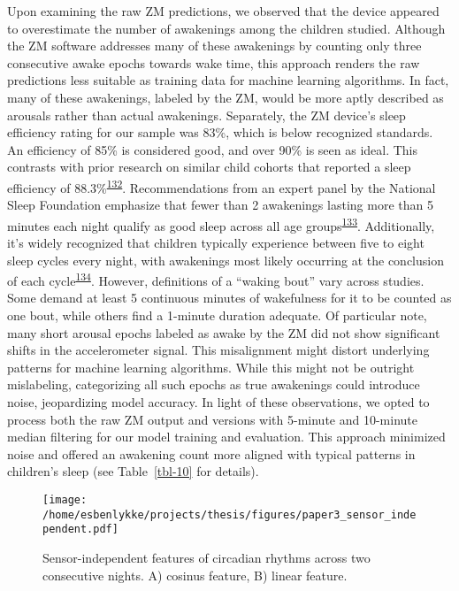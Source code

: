 \documentclass[
  9pt,
]{scrbook}
\begin{document}
Upon examining the raw ZM predictions, we observed that the device
appeared to overestimate the number of awakenings among the children
studied. Although the ZM software addresses many of these awakenings by
counting only three consecutive awake epochs towards wake time, this
approach renders the raw predictions less suitable as training data for
machine learning algorithms. In fact, many of these awakenings, labeled
by the ZM, would be more aptly described as arousals rather than actual
awakenings. Separately, the ZM device's sleep efficiency rating for our
sample was 83\%, which is below recognized standards. An efficiency of
85\% is considered good, and over 90\% is seen as ideal. This contrasts
with prior research on similar child cohorts that reported a sleep
efficiency of
88.3\%\textsuperscript{\protect\hyperlink{ref-galland_2018}{132}}.
Recommendations from an expert panel by the National Sleep Foundation
emphasize that fewer than 2 awakenings lasting more than 5 minutes each
night qualify as good sleep across all age
groups\textsuperscript{\protect\hyperlink{ref-ohayon_2017}{133}}.
Additionally, it's widely recognized that children typically experience
between five to eight sleep cycles every night, with awakenings most
likely occurring at the conclusion of each
cycle\textsuperscript{\protect\hyperlink{ref-galland_normal_2012}{134}}.
However, definitions of a ``waking bout'' vary across studies. Some
demand at least 5 continuous minutes of wakefulness for it to be counted
as one bout, while others find a 1-minute duration adequate. Of
particular note, many short arousal epochs labeled as awake by the ZM
did not show significant shifts in the accelerometer signal. This
misalignment might distort underlying patterns for machine learning
algorithms. While this might not be outright mislabeling, categorizing
all such epochs as true awakenings could introduce noise, jeopardizing
model accuracy. In light of these observations, we opted to process both
the raw ZM output and versions with 5-minute and 10-minute median
filtering for our model training and evaluation. This approach minimized
noise and offered an awakening count more aligned with typical patterns
in children's sleep (see Table~\ref{tbl-10} for details).

\begin{figure}

{\centering \texttt{[image: /home/esbenlykke/projects/thesis/figures/paper3\_sensor\_independent.pdf]}

}

\caption{\label{fig-paper3_sensor_independent}Sensor-independent
features of circadian rhythms across two consecutive nights. A) cosinus
feature, B) linear feature.}

\end{figure}
\end{document}
